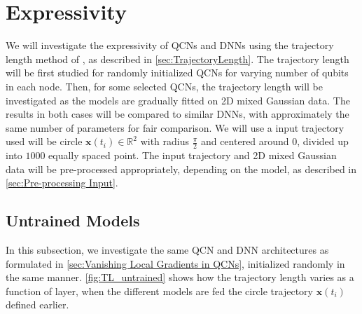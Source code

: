 \section{Expressivity}\label{sec:Expressivity}
We will investigate the expressivity of QCNs and DNNs using the trajectory length method of \citet{raghu2017expressive}, as described in \autoref{sec:TrajectoryLength}. The trajectory length will be first studied for randomly initialized QCNs for varying number of qubits in each node. Then, for some selected QCNs, the trajectory length will be investigated as the models are gradually fitted on 2D mixed Gaussian data. The results in both cases will be compared to similar DNNs, with approximately the same number of parameters for fair comparison. We will use a input trajectory  used will be circle $\boldsymbol{x}(t_i) \in \mathbb{R}^2$ with radius $\frac{\pi}{2}$ and centered around $0$, divided up into $1000$ equally spaced point. The input trajectory and 2D mixed Gaussian data will be pre-processed appropriately, depending on the model, as described in \autoref{sec:Pre-processing Input}.

\subsection{Untrained Models}\label{sec:Untrained Models}

In this subsection, we investigate the same QCN and DNN architectures as formulated in \autoref{sec:Vanishing Local Gradients in QCNs}, initialized randomly in the same manner. \autoref{fig:TL_untrained} shows how the trajectory length varies as a function of layer, when the different models are fed the circle trajectory $\boldsymbol{x}(t_i)$ defined earlier.



